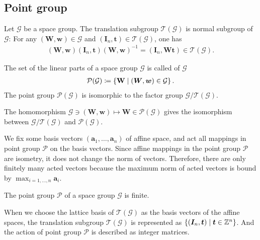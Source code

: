\subsection{Point group}

Let $\mathcal{G}$ be a space group.
The translation subgroup $\mathcal{T}(\mathcal{G})$ is normal subgroup of $\mathcal{G}$:
For any $ (\mathbf{W}, \mathbf{w}) \in \mathcal{G}$ and $(\mathbf{I}_{n}, \mathbf{t}) \in \mathcal{T}(\mathcal{G})$, one has
\begin{align}
  (\bm{W}, \bm{w}) (\bm{I}_{n}, \bm{t}) (\bm{W}, \bm{w})^{-1} = (\bm{I}_{n}, \bm{Wt}) \in \mathcal{T}(\mathcal{G}).
\end{align}

\begin{screen}
  \begin{defn}
    The set of the linear parts of a space group $\mathcal{G}$ is called  of $\mathcal{G}$
    \begin{align}
      \mathcal{P}(\mathcal{G}) \coloneqq \left\{  \mathbf{W}  \mathrel{}\middle|\mathrel{}  (\bm{W}, \bm{w}) \in \mathcal{G}  \right\}.
    \end{align}
    The point group $\mathcal{P}(\mathcal{G})$ is isomorphic to the factor group $\mathcal{G} / \mathcal{T}(\mathcal{G})$.
  \end{defn}
\end{screen}

The homomorphism $\mathcal{G} \ni (\bm{W}, \bm{w}) \mapsto \bm{W} \in \mathcal{P}(\mathcal{G})$ gives the isomorphism between $\mathcal{G} / \mathcal{T}(\mathcal{G})$ and $\mathcal{P}(\mathcal{G})$.

We fix some basis vectors $(\bm{a}_{1}, \dots, \bm{a}_{n})$ of affine space, and act all mappings in point group $\mathcal{P}$ on the basis vectors.
Since affine mappings in the point group $\mathcal{P}$ are isometry, it does not change the norm of vectors.
Therefore, there are only finitely many acted vectors because the maximum norm of acted vectors is bound by $\max_{i=1,\dots,n} \mathbf{a}_{i}$.

\begin{screen}
  \begin{them}
    The point group $\mathcal{P}$ of a space group $\mathcal{G}$ is finite.
  \end{them}
\end{screen}

When we choose the lattice basis of $\mathcal{T}(\mathcal{G})$ as the basis vectors of the affine spaces, the translation subgroup $\mathcal{T}(\mathcal{G})$ is represented as $\left\{  (\bm{I}_{n}, \bm{t})  \mathrel{}\middle|\mathrel{}  \bm{t} \in \mathbb{Z}^{n}  \right\}$.
And the action of point group $\mathcal{P}$ is described as integer matrices.

